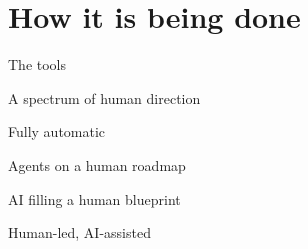 \section{How it is being done}

\begin{frame}{The tools}
\end{frame}

\begin{frame}{A spectrum of human direction}
\end{frame}

\begin{frame}{Fully automatic}
\end{frame}

\begin{frame}{Agents on a human roadmap}
\end{frame}

\begin{frame}{AI filling a human blueprint}
\end{frame}

\begin{frame}{Human-led, AI-assisted}
\end{frame}

